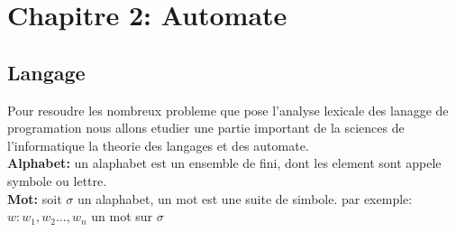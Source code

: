 \documentclass[a4paper,11pt]{article}
\begin{document}
  \section{\color{OrangeHaf}Chapitre 2: Automate}
  \subsection{Langage}
  Pour resoudre les nombreux probleme que pose l'analyse lexicale des lanagge de programation nous allons etudier une partie 
  important de la sciences de l'informatique la theorie des langages et des automate.\\
      \textbf{Alphabet:}
        un alaphabet est un ensemble de fini, dont les element sont appele symbole ou lettre.
        \\
      \textbf{Mot:}
        soit $\sigma$ un alaphabet, un mot est une suite de simbole. par exemple: $w:w_1,w_2\ldots,w_n$ un mot sur $\sigma$
        
\end{document}

